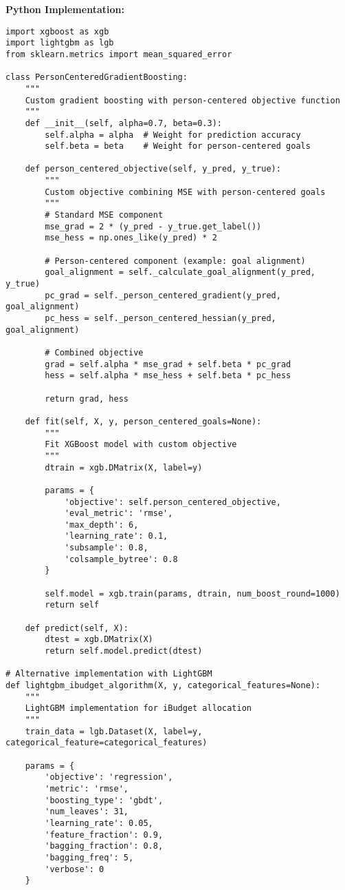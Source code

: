 \documentclass[12pt]{article}
\begin{document}
\textbf{Python Implementation:}
\begin{lstlisting}
import xgboost as xgb
import lightgbm as lgb
from sklearn.metrics import mean_squared_error

class PersonCenteredGradientBoosting:
    """
    Custom gradient boosting with person-centered objective function
    """
    def __init__(self, alpha=0.7, beta=0.3):
        self.alpha = alpha  # Weight for prediction accuracy
        self.beta = beta    # Weight for person-centered goals
        
    def person_centered_objective(self, y_pred, y_true):
        """
        Custom objective combining MSE with person-centered goals
        """
        # Standard MSE component
        mse_grad = 2 * (y_pred - y_true.get_label())
        mse_hess = np.ones_like(y_pred) * 2
        
        # Person-centered component (example: goal alignment)
        goal_alignment = self._calculate_goal_alignment(y_pred, y_true)
        pc_grad = self._person_centered_gradient(y_pred, goal_alignment)
        pc_hess = self._person_centered_hessian(y_pred, goal_alignment)
        
        # Combined objective
        grad = self.alpha * mse_grad + self.beta * pc_grad
        hess = self.alpha * mse_hess + self.beta * pc_hess
        
        return grad, hess
    
    def fit(self, X, y, person_centered_goals=None):
        """
        Fit XGBoost model with custom objective
        """
        dtrain = xgb.DMatrix(X, label=y)
        
        params = {
            'objective': self.person_centered_objective,
            'eval_metric': 'rmse',
            'max_depth': 6,
            'learning_rate': 0.1,
            'subsample': 0.8,
            'colsample_bytree': 0.8
        }
        
        self.model = xgb.train(params, dtrain, num_boost_round=1000)
        return self
    
    def predict(self, X):
        dtest = xgb.DMatrix(X)
        return self.model.predict(dtest)

# Alternative implementation with LightGBM
def lightgbm_ibudget_algorithm(X, y, categorical_features=None):
    """
    LightGBM implementation for iBudget allocation
    """
    train_data = lgb.Dataset(X, label=y, categorical_feature=categorical_features)
    
    params = {
        'objective': 'regression',
        'metric': 'rmse',
        'boosting_type': 'gbdt',
        'num_leaves': 31,
        'learning_rate': 0.05,
        'feature_fraction': 0.9,
        'bagging_fraction': 0.8,
        'bagging_freq': 5,
        'verbose': 0
    }
    

\end{lstlisting}
\end{document}
